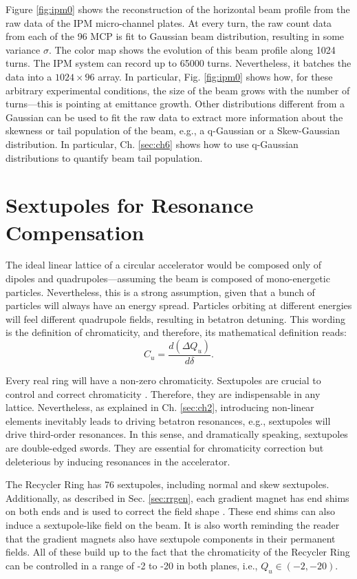 Figure \ref{fig:ipm0} shows the reconstruction of the horizontal beam profile from the raw data of the IPM micro-channel plates. At every turn, the raw count data from each of the 96 MCP is fit to Gaussian beam distribution, resulting in some variance $\sigma$. The color map shows the evolution of this beam profile along 1024 turns. The IPM system can record up to 65000 turns. Nevertheless, it batches the data into a $1024 \times 96$ array. In particular, Fig. \ref{fig:ipm0} shows how, for these arbitrary experimental conditions, the size of the beam grows with the number of turns---this is pointing at emittance growth. Other distributions different from a Gaussian can be used to fit the raw data to extract more information about the skewness or tail population of the beam, e.g., a q-Gaussian or a Skew-Gaussian distribution. In particular, Ch. \ref{sec:ch6} shows how to use q-Gaussian distributions to quantify beam tail population.

\section{\label{sec:css}Sextupoles for Resonance Compensation}

The ideal linear lattice of a circular accelerator would be composed only of dipoles and quadrupoles---assuming the beam is composed of mono-energetic particles. Nevertheless, this is a strong assumption, given that a bunch of particles will always have an energy spread. Particles orbiting at different energies will feel different quadrupole fields, resulting in betatron detuning. This wording is the definition of chromaticity, and therefore, its mathematical definition reads:
\begin{equation}
   \label{eq:chrom}
   C_u=\frac{d \left( \Delta Q_u \right)}{d \delta}.
\end{equation}    

Every real ring will have a non-zero chromaticity. Sextupoles are crucial to control and correct chromaticity \cite{sylee}. Therefore, they are indispensable in any lattice. Nevertheless, as explained in Ch. \ref{sec:ch2}, introducing non-linear elements inevitably leads to driving betatron resonances, e.g., sextupoles will drive third-order resonances. In this sense, and dramatically speaking, sextupoles are double-edged swords. They are essential for chromaticity correction but deleterious by inducing resonances in the accelerator.

The Recycler Ring has 76 sextupoles, including normal and skew sextupoles. Additionally, as described in Sec. \ref{sec:rrgen}, each gradient magnet has end shims on both ends and is used to correct the field shape \cite{meiqin2}. These end shims can also induce a sextupole-like field on the beam. It is also worth reminding the reader that the gradient magnets also have sextupole components in their permanent fields. All of these build up to the fact that the chromaticity of the Recycler Ring can be controlled in a range of -2 to -20 in both planes, i.e., $Q_u\in (-2, -20)$.    


